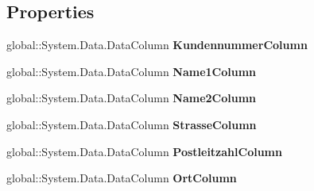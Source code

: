 \subsection*{Properties}
\begin{DoxyCompactItemize}
\item 
global\+::\+System.\+Data.\+Data\+Column {\bfseries Kundennummer\+Column}\hypertarget{class_products_1_1_data_1_1ds_sage_1_1_customer_data_table_a8fb91bdc33611bc7078329fa5bca067a}{}\label{class_products_1_1_data_1_1ds_sage_1_1_customer_data_table_a8fb91bdc33611bc7078329fa5bca067a}

\item 
global\+::\+System.\+Data.\+Data\+Column {\bfseries Name1\+Column}\hypertarget{class_products_1_1_data_1_1ds_sage_1_1_customer_data_table_ac65f794b0a2f9558d0b650dfcff57f80}{}\label{class_products_1_1_data_1_1ds_sage_1_1_customer_data_table_ac65f794b0a2f9558d0b650dfcff57f80}

\item 
global\+::\+System.\+Data.\+Data\+Column {\bfseries Name2\+Column}\hypertarget{class_products_1_1_data_1_1ds_sage_1_1_customer_data_table_a92e33e832d1f15d1be37e1eba83481e9}{}\label{class_products_1_1_data_1_1ds_sage_1_1_customer_data_table_a92e33e832d1f15d1be37e1eba83481e9}

\item 
global\+::\+System.\+Data.\+Data\+Column {\bfseries Strasse\+Column}\hypertarget{class_products_1_1_data_1_1ds_sage_1_1_customer_data_table_ad555c361147f2b3bfb9283197922d746}{}\label{class_products_1_1_data_1_1ds_sage_1_1_customer_data_table_ad555c361147f2b3bfb9283197922d746}

\item 
global\+::\+System.\+Data.\+Data\+Column {\bfseries Postleitzahl\+Column}\hypertarget{class_products_1_1_data_1_1ds_sage_1_1_customer_data_table_a11ae99c3ea31e80373dae2c2d3851ff2}{}\label{class_products_1_1_data_1_1ds_sage_1_1_customer_data_table_a11ae99c3ea31e80373dae2c2d3851ff2}

\item 
global\+::\+System.\+Data.\+Data\+Column {\bfseries Ort\+Column}\hypertarget{class_products_1_1_data_1_1ds_sage_1_1_customer_data_table_af7beb8503e9b67235096aaf588b37a5d}{}\label{class_products_1_1_data_1_1ds_sage_1_1_customer_data_table_af7beb8503e9b67235096aaf588b37a5d}


\end{DoxyCompactItemize}
